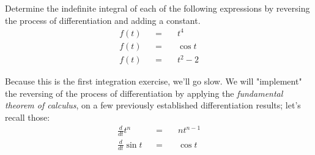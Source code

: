 \documentclass[solutions.tex]{subfiles}
\begin{document}
\maketitle
\begin{exercise} Determine the indefinite integral
of each of the following expressions by reversing the process
of differentiation and adding a constant.
\begin{equation*} \begin{aligned}
	f(t) &&=\quad& t^4 \\
	f(t) &&=\quad& \cos t \\
	f(t) &&=\quad& t^2-2
\end{aligned} \end{equation*}
\end{exercise}
Because this is the first integration exercise, we'll go slow.
We will "implement" the reversing of the process of differentiation
by applying the \textit{fundamental theorem of calculus}, on a few
previously established differentiation results; let's recall those:
\begin{equation*} \begin{aligned}
	\frac{d}{dt}t^n &&=\quad& nt^{n-1} \\
	\frac{d}{dt}\sin t &&=\quad& \cos t
\end{aligned} \end{equation*}
\end{document}
